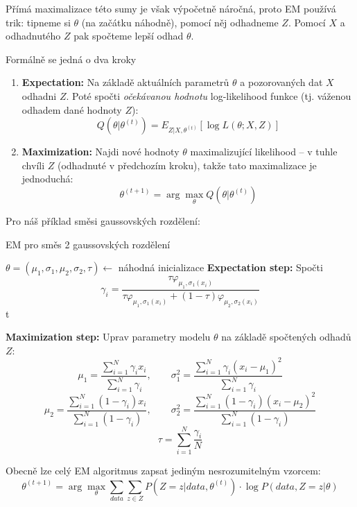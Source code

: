 \documentclass[11pt]{report} %
\numberwithin{equation}{section}
\begin{document}
Přímá maximalizace této sumy je však výpočetně náročná, proto EM používá trik: tipneme si $\theta$ (na začátku náhodně), pomocí něj odhadneme $Z$. Pomocí $X$ a odhadnutého $Z$ pak spočteme lepší odhad $\theta$.

Formálně se jedná o dva kroky
\begin{enumerate}
	\item \textbf{Expectation:} Na základě aktuálních parametrů $\theta$ a pozorovaných dat $X$ odhadni $Z$. Poté spočti \textit{očekávanou hodnotu} log-likelihood funkce (tj. váženou odhadem dané hodnoty $Z$):
	$$Q(\theta|\theta^{(t)}) = E_{Z|X,\theta^{(t)}} [\log L(\theta;X,Z)]$$
	\item \textbf{Maximization:} Najdi nové hodnoty $\theta$ maximalizující likelihood -- v tuhle chvíli  $Z$ (odhadnuté v předchozím kroku), takže tato maximalizace je jednoduchá:
	$$\theta^{(t+1)} = \arg\max_\theta Q(\theta|\theta^{(t)})$$
\end{enumerate}

Pro náš příklad směsi gaussovských rozdělení:
\bigskip
\begin{algorithm}[H]
	\caption{EM pro směs 2 gaussovských rozdělení}
	\begin{algorithmic}[1]
		\State $\theta = (\mu_1,\sigma_1,\mu_2,\sigma_2,\tau) \gets$ náhodná inicializace
		\State \textbf{Expectation step:} Spočti
		$$\gamma_i = \frac{\tau\varphi_{\mu_1,\sigma_1(x_i)}}{\tau\varphi_{\mu_1,\sigma_1(x_i)} 
			+ (1-\tau)\varphi_{\mu_2,\sigma_2(x_i)}}$$
		t
		
		\State \textbf{Maximization step:} Uprav parametry modelu $\theta$ na základě spočtených odhadů $Z$:
		$$
		\mu_1 = \frac{\sum_{i=1}^{N}\gamma_i x_i}{\sum_{i=1}^{N}\gamma_i},\qquad
		\sigma^2_1 = \frac{\sum_{i=1}^{N}\gamma_i (x_i - \mu_1)^2}{\sum_{i=1}^{N}\gamma_i}
		$$
		$$
		\mu_2 = \frac{\sum_{i=1}^{N}(1-\gamma_i) x_i}{\sum_{i=1}^{N}(1-\gamma_i)},\qquad
		\sigma^2_2 = \frac{\sum_{i=1}^{N}(1-\gamma_i)(x_i - \mu_2)^2}{\sum_{i=1}^{N}(1-\gamma_i)}
		$$
		$$\tau = \sum_{i=1}^{N}\frac{\gamma_i}{N}$$
		\EndWhile
	\end{algorithmic}
\end{algorithm}		

\bigskip
Obecně lze celý EM algoritmus zapsat jediným nesrozumitelným vzorcem:
$$\theta^{(t+1)} = \arg\max_\theta\sum_{data}\sum_{z \in Z} P(Z = z | data,\theta^{(t)}) \cdot \log P(data, Z = z |\theta)$$
\end{document}
